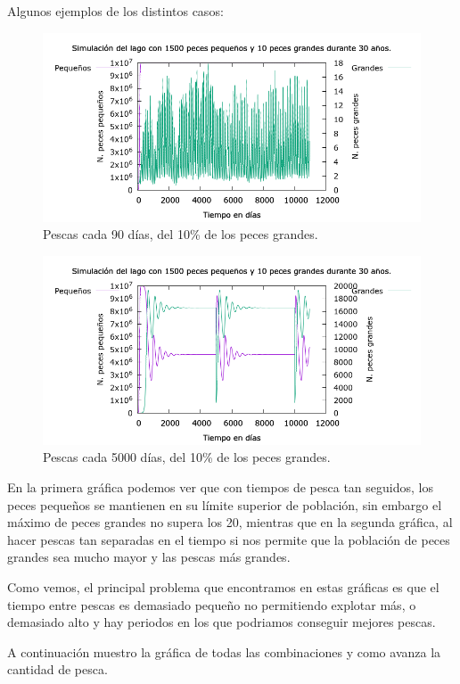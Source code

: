 \documentclass[12pt, spanish]{article}
\begin{document}
Algunos ejemplos de los distintos casos:



\begin{figure}[H]
	\centering
	\includegraphics[scale = 0.6]{lago_10950_1500_10_0.90_90.png}
	\caption{Pescas cada 90 días, del 10\% de los peces grandes.}
	\label{fig:ej4}
\end{figure}

\begin{figure}[H]
	\centering
	\includegraphics[scale = 0.6]{lago_10950_1500_10_0.90_5000.png}
	\caption{Pescas cada 5000 días, del 10\% de los peces grandes.}
	\label{fig:ej4}
\end{figure}

En la primera gráfica podemos ver que con tiempos de pesca tan seguidos, los peces pequeños se mantienen en su límite superior de población, sin embargo el máximo de peces grandes no supera los 20, mientras que en la segunda gráfica, al hacer pescas tan separadas en el tiempo si nos permite que la población de peces grandes sea mucho mayor y las pescas más grandes.

Como vemos, el principal problema que encontramos en estas gráficas es que el tiempo entre pescas es demasiado pequeño no permitiendo explotar más, o demasiado alto y hay periodos en los que podriamos conseguir mejores pescas.

A continuación muestro la gráfica de todas las combinaciones y como avanza la cantidad de pesca.



%
%
\end{document}
